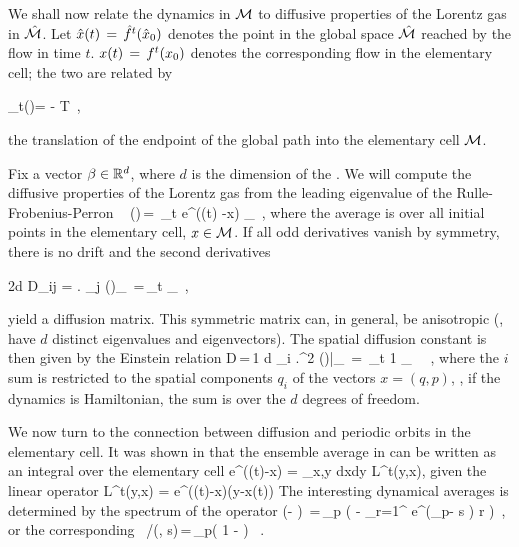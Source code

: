 \documentclass[aps,pre,
                showpacs,
                twocolumn,
                groupedaddress,
                floatfix]{revtex4-1}
\begin{document}
We shall now relate the dynamics in ${\cal M}$ to diffusive properties of the Lorentz
gas in $\hat {{\cal M}}$. Let $\hat x(t)\,=\,{\hat{f}^{t}(\hat x_0)}$ denotes the point in the global
space $\hat {{\cal M}}$ reached by the flow in time $t$. $x(t)\,=\,{f^{t}({x_0})}$ denotes
the corresponding flow in the elementary cell; the two are related by

\beq
\hn_t(\xInit)= -  \in T \,,

the translation of the endpoint of the global path into the elementary
cell $\pS$.

Fix a vector $\beta \in \reals^d$, where $d$ is the dimension of the
{\statesp}. We will compute the diffusive properties of the Lorentz
gas from the leading eigenvalue of the Rulle-Frobenius-Perron \evOper\
\beq
\eigenvL(\beta)\,=\, \lim_{t \rightarrow \infty}  \log \langle
e^{\beta \cdot (\hx(t) -x) } \rangle_\pS ~, \quad
\label{eq-diff-1}
\eeq
where the average is over all initial points in the elementary cell, $x \in
{\cal M}$. If all odd derivatives vanish by symmetry, there is no drift and the
second derivatives
\begin{widetext}
\beq
2d D_{ij} = \left . {} {\frac{\partial} 
{\partial \beta_j}} \eigenvL(\beta)\right\vert_{\beta=0} \,=\,\lim_{t\rightarrow
\infty} {\frac{1}{t}} \langle {(\hx(t) -x)_i (\hx(t) -x)_j } \rangle_\pS ~,
\eeq
\end{widetext}
yield a diffusion matrix.  This symmetric matrix can, in general, be anisotropic
(\ie, have $d$ distinct eigenvalues and eigen\-vectors). The spatial diffusion
constant is then given by the Einstein relation
\beq
D\,=\,{1 d} \sum_i \left .{{\partial}^2 } \eigenvL(\beta)\right |_{} \,=\,
\lim_{t\rightarrow \infty} {1} 
\rangle_\pS~ ~,
\eeq
where the $i$ sum is restricted to the spatial components $q_i$ of the
{\statesp} vectors $x=(q,p)$, \ie, if the dynamics is Hamiltonian, the sum is
over the $d$ degrees of freedom.


We now turn to the connection between diffusion and periodic orbits in
the elementary cell. It was shown in \refref{CGS92} that the ensemble average in
\refeq{eq-diff-1} can be written as an integral over the elementary cell
\beq
\langle e^{\beta\cdot(\hx(t)-x)} \rangle
   = \int_{x,y\in \pS} dxdy {\cal L}^t(y,x),
\eeq
given the linear \evOper operator
\beq
{\cal L}^t(y,x) = e^{\beta\cdot(\hx(t)-x)}\delta(y-x(t))
\label{eq-eOper}
\eeq
The interesting dynamical averages is determined by the spectrum of the operator
\beq \det(\eigenvL - \Lop) \,=\,\prod_{p} \exp \left(
  - { \sum_{r=1}^ { e^{(\beta \cdot \hn_p- s
        ) r} \over {} }
  } \right) \,,
or the corresponding \dzeta\
/\zeta(\beta, s)\,=\,\prod_{p}\left( 1 -  \right) ~.
\label{zeta-diff}
\eeq
\end{document}
